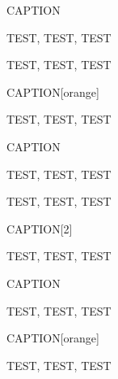 \begin{ascolorbox3}{CAPTION}

TEST, TEST, TEST

\end{ascolorbox3}

\begin{ascolorbox3}{}

TEST, TEST, TEST

\end{ascolorbox3}

\begin{ascolorbox3}{CAPTION}[orange]

TEST, TEST, TEST

\end{ascolorbox3}

\begin{ascolorbox4}{CAPTION}

TEST, TEST, TEST

\end{ascolorbox4}

\begin{ascolorbox4}{}

TEST, TEST, TEST

\end{ascolorbox4}

\begin{ascolorbox4}{CAPTION}[2]

TEST, TEST, TEST

\end{ascolorbox4}

\begin{ascolorbox5}{CAPTION}

TEST, TEST, TEST

\end{ascolorbox5}




\begin{ascolorbox5}{CAPTION}[orange]

TEST, TEST, TEST

\end{ascolorbox5}

